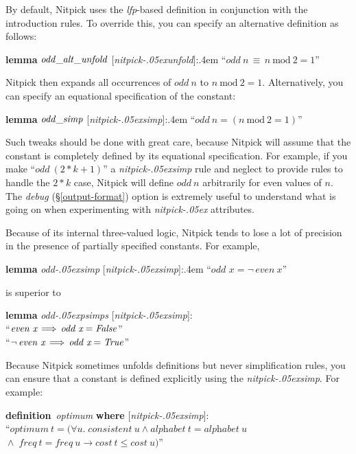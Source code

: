 \documentclass[a4paper,12pt]{article}
\renewcommand\_{\hbox{\textunderscore\kern-.05ex}}
\begin{document}
By default, Nitpick uses the \textit{lfp}-based definition in conjunction with
the introduction rules. To override this, you can specify an alternative
definition as follows:

\prew
\textbf{lemma} $\mathit{odd\_alt\_unfold}$ [\textit{nitpick\_unfold}]:\kern.4em ``$\textit{odd}~n \,\equiv\, n~\textrm{mod}~2 = 1$''
\postw

Nitpick then expands all occurrences of $\mathit{odd}~n$ to $n~\textrm{mod}~2
= 1$. Alternatively, you can specify an equational specification of the constant:

\prew
\textbf{lemma} $\mathit{odd\_simp}$ [\textit{nitpick\_simp}]:\kern.4em ``$\textit{odd}~n = (n~\textrm{mod}~2 = 1)$''
\postw

Such tweaks should be done with great care, because Nitpick will assume that the
constant is completely defined by its equational specification. For example, if
you make ``$\textit{odd}~(2 * k + 1)$'' a \textit{nitpick\_simp} rule and neglect to provide rules to handle the $2 * k$ case, Nitpick will define
$\textit{odd}~n$ arbitrarily for even values of $n$. The \textit{debug}
(\S\ref{output-format}) option is extremely useful to understand what is going
on when experimenting with \textit{nitpick\_} attributes.

Because of its internal three-valued logic, Nitpick tends to lose a
lot of precision in the presence of partially specified constants. For example,

\prew
\textbf{lemma} \textit{odd\_simp} [\textit{nitpick\_simp}]:\kern.4em ``$\textit{odd~x} = \lnot\, \textit{even}~x$''
\postw

is superior to

\prew
\textbf{lemma} \textit{odd\_psimps} [\textit{nitpick\_simp}]: \\
``$\textit{even~x} \,\Longrightarrow\, \textit{odd~x} = \textit{False\/}$'' \\
``$\lnot\, \textit{even~x} \,\Longrightarrow\, \textit{odd~x} = \textit{True\/}$''
\postw

Because Nitpick sometimes unfolds definitions but never simplification rules,
you can ensure that a constant is defined explicitly using the
\textit{nitpick\_simp}. For example:

\prew
\textbf{definition}~\textit{optimum} \textbf{where} [\textit{nitpick\_simp}]: \\
``$\textit{optimum}~t =
     (\forall u.\; \textit{consistent}~u \mathrel{\land} \textit{alphabet}~t = \textit{alphabet}~u$ \\
${\mathrel{\land}}\; \textit{freq}~t = \textit{freq}~u \longrightarrow
         \textit{cost}~t \le \textit{cost}~u)$''
\postw
\end{document}
